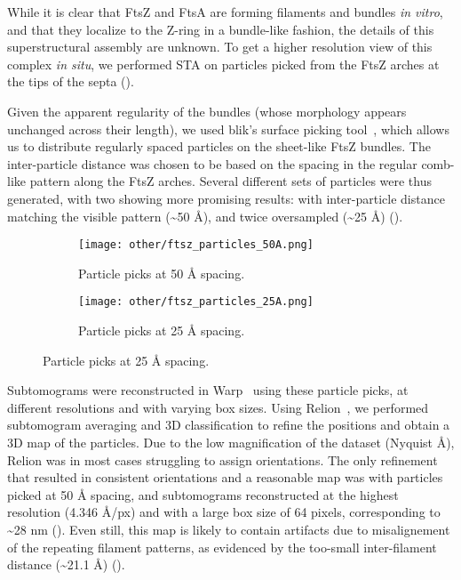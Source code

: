 While it is clear that FtsZ and FtsA are forming filaments and bundles \textit{in vitro}, and that they localize to the Z-ring in a bundle-like fashion, the details of this superstructural assembly are unknown.
To get a higher resolution view of this complex \textit{in situ}, we performed STA on particles picked from the FtsZ arches at the tips of the septa ().

Given the apparent regularity of the bundles (whose morphology appears unchanged across their length), we used blik's surface picking tool~\cite{gaifasBlikExtensible3D2024,gaifasBlikPythonTool2024}, which allows us to distribute regularly spaced particles on the sheet-like FtsZ bundles.
The inter-particle distance was chosen to be based on the spacing in the regular comb-like pattern along the FtsZ arches.
Several different sets of particles were thus generated, with two showing more promising results: with inter-particle distance matching the visible pattern (\sim50 Å), and twice oversampled (\sim25 Å) ().

\begin{figure}
    \centering
    \begin{subfigure}[B]{.49\textwidth}
        \centering
        \texttt{[image: other/ftsz\_particles\_50A.png]}
        \caption{Particle picks at 50 Å spacing.}
        \label{fig:ftsz_tomo_picks_50}
    \end{subfigure}%
    \hfill
    \begin{subfigure}[B]{.49\textwidth}
        \centering
        \texttt{[image: other/ftsz\_particles\_25A.png]}
        \caption{Particle picks at 25 Å spacing.}
        \label{fig:ftsz_tomo_picks_25}
    \end{subfigure}%
    \label{fig:ftsz_tomo_picks}
\end{figure}

Subtomograms were reconstructed in Warp~\cite{tegunovRealtimeCryoelectronMicroscopy2019} using these particle picks, at different resolutions and with varying box sizes.
Using Relion~\cite{scheresRELIONImplementationBayesian2012,zivanovBayesianApproachSingleparticle2022,burtImageProcessingPipeline2024}, we performed subtomogram averaging and 3D classification to refine the positions and obtain a 3D map of the particles.
Due to the low magnification of the dataset (Nyquist  Å), Relion was in most cases struggling to assign orientations.
The only refinement that resulted in consistent orientations and a reasonable map was with particles picked at 50 Å spacing, and subtomograms reconstructed at the highest resolution (4.346 Å/px) and with a large box size of 64 pixels, corresponding to \sim28 nm ().
Even still, this map is likely to contain artifacts due to misalignement of the repeating filament patterns, as evidenced by the too-small inter-filament distance (\sim21.1 Å) ().

